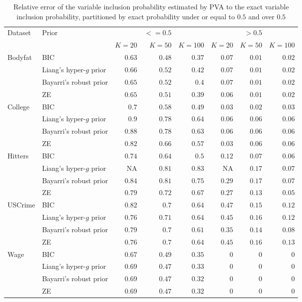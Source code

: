 \begin{table}[!ht]
\begin{tabular}{|ll|rrr|rrr|}
	\hline
	Dataset & Prior & & $<=0.5$ & & & $>0.5$ &\\
	& & $K = 20$ & $K = 50$ & $K = 100$ & $K = 20$ & $K = 50$ & $K = 100$ \\
	\hline
	Bodyfat&BIC&$0.63$&$0.48$&$0.37$&$0.07$&$0.01$&$0.02$\\
	&Liang's hyper-$g$ prior&$0.66$&$0.52$&$0.42$&$0.07$&$0.01$&$0.02$\\
	&Bayarri's robust prior&$0.65$&$0.52$&$0.4$&$0.07$&$0.01$&$0.02$\\
	&ZE&$0.65$&$0.51$&$0.39$&$0.06$&$0.01$&$0.02$\\
	College&BIC&$0.7$&$0.58$&$0.49$&$0.03$&$0.02$&$0.03$\\
	&Liang's hyper-$g$ prior&$0.9$&$0.78$&$0.64$&$0.06$&$0.06$&$0.06$\\
	&Bayarri's robust prior&$0.88$&$0.78$&$0.63$&$0.06$&$0.06$&$0.06$\\
	&ZE&$0.82$&$0.66$&$0.57$&$0.03$&$0.06$&$0.06$\\
	Hitters&BIC&$0.74$&$0.64$&$0.5$&$0.12$&$0.07$&$0.06$\\
	&Liang's hyper-$g$ prior&NA&$0.81$&$0.83$&NA&$0.17$&$0.07$\\
	&Bayarri's robust prior&$0.84$&$0.81$&$0.75$&$0.29$&$0.17$&$0.07$\\
	&ZE&$0.79$&$0.72$&$0.67$&$0.27$&$0.13$&$0.05$\\
	USCrime&BIC&$0.82$&$0.7$&$0.64$&$0.47$&$0.15$&$0.12$\\
	&Liang's hyper-$g$ prior&$0.76$&$0.71$&$0.64$&$0.45$&$0.16$&$0.12$\\
	&Bayarri's robust prior&$0.79$&$0.7$&$0.61$&$0.35$&$0.14$&$0.08$\\
	&ZE&$0.76$&$0.7$&$0.64$&$0.45$&$0.16$&$0.13$\\
	Wage&BIC&$0.67$&$0.49$&$0.35$&$0$&$0$&$0$\\
	&Liang's hyper-$g$ prior&$0.69$&$0.47$&$0.33$&$0$&$0$&$0$\\
	&Bayarri's robust prior&$0.69$&$0.47$&$0.32$&$0$&$0$&$0$\\
	&ZE&$0.69$&$0.47$&$0.32$&$0$&$0$&$0$\\
	\hline
\end{tabular}
\label{tab:variable_inclusion_rel_error}
\caption{Relative error of the variable inclusion probability estimated by PVA to the
					exact variable inclusion probability, partitioned by exact probability under or equal to $0.5$ and
					over $0.5$}
\end{table}

